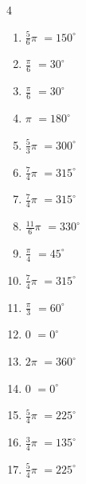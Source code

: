 \begin{multicols}{4}
\begin{enumerate}
  \item $\displaystyle \frac{5}{6}\pi$
        $\displaystyle =150^{\circ}$

  \item $\displaystyle \frac{\pi}{6}$
        $\displaystyle =30^{\circ}$

  \item $\displaystyle \frac{\pi}{6}$
        $\displaystyle =30^{\circ}$

  \item $\displaystyle \pi$
        $\displaystyle =180^{\circ}$

  \item $\displaystyle \frac{5}{3}\pi$
        $\displaystyle =300^{\circ}$

  \item $\displaystyle \frac{7}{4}\pi$
        $\displaystyle =315^{\circ}$

  \item $\displaystyle \frac{7}{4}\pi$
        $\displaystyle =315^{\circ}$

  \item $\displaystyle \frac{11}{6}\pi$
        $\displaystyle =330^{\circ}$

  \item $\displaystyle \frac{\pi}{4}$
        $\displaystyle =45^{\circ}$

  \item $\displaystyle \frac{7}{4}\pi$
        $\displaystyle =315^{\circ}$

\columnbreak %

\resetques

  \item $\displaystyle \frac{\pi}{3}$
        $\displaystyle =60^{\circ}$

  \item $\displaystyle 0$
        $\displaystyle =0^{\circ}$

  \item $\displaystyle 2\pi$
        $\displaystyle =360^{\circ}$

  \item $\displaystyle 0$
        $\displaystyle =0^{\circ}$

  \item $\displaystyle \frac{5}{4}\pi$
        $\displaystyle =225^{\circ}$

  \item $\displaystyle \frac{3}{4}\pi$
        $\displaystyle =135^{\circ}$

  \item $\displaystyle \frac{5}{4}\pi$
        $\displaystyle =225^{\circ}$


\end{enumerate}
\end{multicols}

